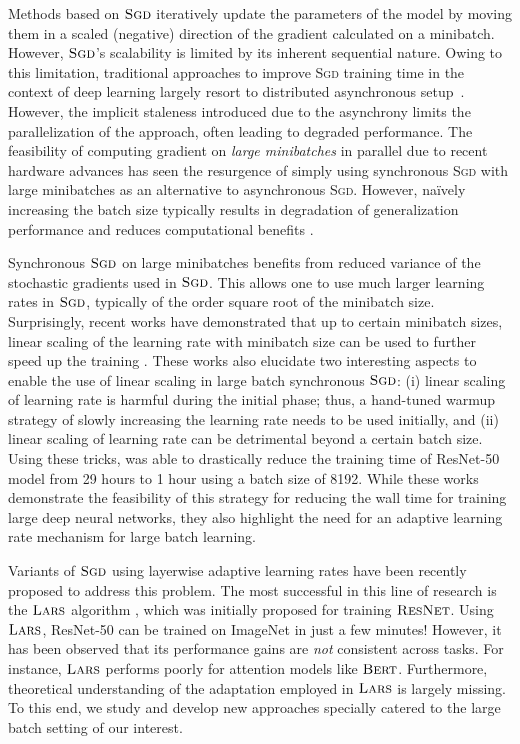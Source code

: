 \documentclass{article} \usepackage{iclr2020_conference,times}
\newcommand{\resnet}{\textsc{ResNet}}
\newcommand{\bert}{\textsc{Bert}\xspace}
\newcommand{\sgd}{\textsc{Sgd}\xspace}
\newcommand{\lars}{\textsc{Lars}}
\begin{document}
Methods based on $\sgd$ iteratively update the parameters of the model by moving them in a scaled (negative) direction of the gradient calculated on a minibatch.   However, $\sgd$'s scalability is limited by its inherent sequential nature. Owing to this limitation, traditional approaches to improve \sgd training time in the context of deep learning largely resort to distributed asynchronous setup~\citep{dean2012large,recht2011hogwild}. However,  the implicit staleness introduced due to the asynchrony limits the parallelization of the approach, often leading to degraded performance. The feasibility of computing gradient on \emph{large minibatches} in parallel due to recent hardware advances has seen the resurgence of simply using synchronous \sgd with large minibatches as an alternative to asynchronous \sgd. However, na\"ively increasing the batch size typically results in degradation of generalization performance and reduces computational benefits \citep{goyal2017accurate}.

Synchronous $\sgd$ on large minibatches benefits from reduced variance of the stochastic gradients used in $\sgd$. This allows one to use much larger learning rates in $\sgd$, typically of the order square root of the minibatch size. Surprisingly, recent works have demonstrated that up to certain minibatch sizes, linear scaling of the learning rate with minibatch size can be used to further speed up the training \cite{goyal2017accurate}. These works also elucidate two interesting aspects to enable the use of linear scaling in large batch synchronous $\sgd$: (i) linear scaling of learning rate is harmful during the initial phase; thus, a hand-tuned warmup strategy of slowly increasing the learning rate needs to be used initially, and (ii) linear scaling of learning rate can be detrimental beyond a certain batch size. Using these tricks, \cite{goyal2017accurate} was able to drastically reduce the training time of ResNet-50 model from 29 hours to 1 hour using a batch size of 8192. While these works demonstrate the feasibility of this strategy for reducing the wall time for training large deep neural networks, they also highlight the need for an adaptive learning rate mechanism for large batch learning. 

Variants of $\sgd$ using layerwise adaptive learning rates have been recently proposed to address this problem. The most successful in this line of research is the $\lars$ algorithm \citep{you2017scaling}, which was initially proposed for training $\resnet$. Using $\lars$, ResNet-50 can be trained on ImageNet in just a few minutes! However, it has been observed that its performance gains are \emph{not} consistent across tasks. For instance, $\lars$ performs poorly for attention models like $\bert$. Furthermore, theoretical understanding of the adaptation employed in $\lars$ is largely missing. To this end, we study and develop new approaches specially catered to the large batch setting of our interest.
\end{document}
